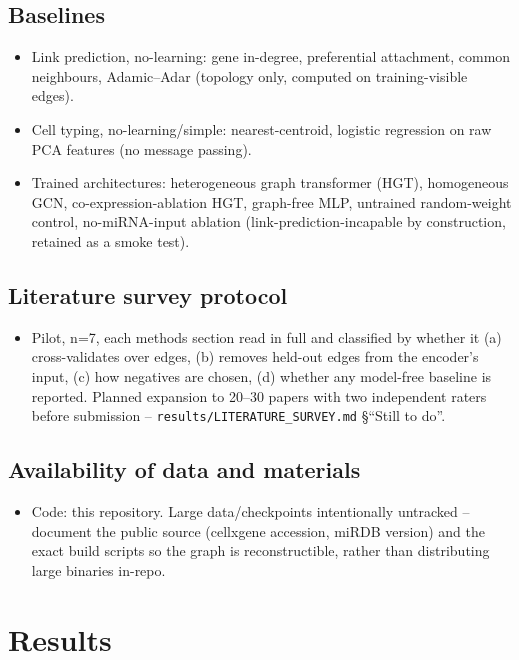 \documentclass{bmcart}
\begin{document}
\subsection*{Baselines}
\begin{itemize}
\item [STAGE] Link prediction, no-learning: gene in-degree, preferential attachment,
common neighbours, Adamic--Adar (topology only, computed on training-visible edges).
\item [STAGE] Cell typing, no-learning/simple: nearest-centroid, logistic regression on
raw PCA features (no message passing).
\item [STAGE] Trained architectures: heterogeneous graph transformer (HGT), homogeneous
GCN, co-expression-ablation HGT, graph-free MLP, untrained random-weight control,
no-miRNA-input ablation (link-prediction-incapable by construction, retained as a
smoke test).
\end{itemize}

\subsection*{Literature survey protocol}
\begin{itemize}
\item [STAGE] Pilot, n=7, each methods section read in full and classified by whether
it (a) cross-validates over edges, (b) removes held-out edges from the encoder's input,
(c) how negatives are chosen, (d) whether any model-free baseline is reported. Planned
expansion to 20--30 papers with two independent raters before submission --
\texttt{results/LITERATURE\_SURVEY.md} \S``Still to do''.
\end{itemize}

\subsection*{Availability of data and materials}
\begin{itemize}
\item [STAGE] Code: this repository. Large data/checkpoints intentionally untracked --
document the public source (cellxgene accession, miRDB version) and the exact build
scripts so the graph is reconstructible, rather than distributing large binaries
in-repo.
\end{itemize}

\section*{Results}
\end{document}

